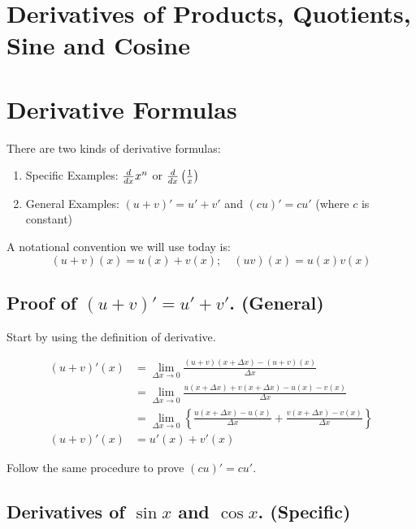 

\section*{\centering Derivatives of Products, Quotients, Sine and Cosine}  

\bigbreak
\section{Derivative Formulas}

There are two kinds of derivative formulas:

\begin{enumerate}
\item Specific Examples: $\frac{d{}}{d{x}} x^n$ or $\frac{d{}}{d{x}} \left( \frac{1}{x} \right) $
\item General Examples: $(u+v)' = u' + v'$ and $(cu)' = cu'$ (where $c$ is constant)
\end{enumerate}

A notational convention we will use today is:
$$(u+v)(x) = u(x) + v(x); \quad (uv)(x) = u(x)v(x)$$ 

\subsection{Proof of $(u+v)' = u'+v'$. (General)}

Start by using the definition of derivative.

\begin{equation*}
\begin{split}
	(u+v)'(x)	& = \lim_{\Delta x \to 0} \frac{(u+v)(x+\Delta x) - (u+v)(x)}{\Delta x} \\
				& = \lim_{\Delta x \to 0} \frac{u(x+\Delta x)+v(x+\Delta x) - u(x) - v(x)}{\Delta x} \\
				& = \lim_{\Delta x \to 0} \left\{ \frac{u(x+\Delta x) - u(x)}{\Delta x} + \frac{v(x+\Delta x) - v(x)}{\Delta x} \right\} \\
	(u+v)'(x)	& = u'(x) + v'(x)
\end{split}
\end{equation*}

Follow the same procedure to prove $(cu)' = cu'$.

\subsection{Derivatives of $\sin x$ and $\cos x$. (Specific)}

